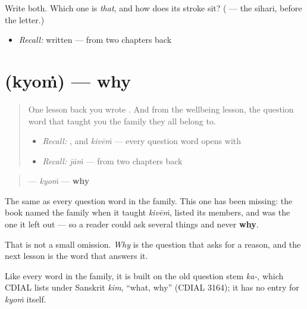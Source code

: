 \begin{tcolorbox}[breakable,colback=teal!4,colframe=teal!35!black,title={Before you move on}]
Write both. Which one is \emph{that}, and how does its stroke sit? (\textbf{} — the sihari, before the letter.)

\begin{itemize}
\raggedright
  \item \emph{Recall:} \textbf{} written — from two chapters back
\end{itemize}
\end{tcolorbox}
\section[\texorpdfstring{\pa{ਕਿਉਂ} (kyoṁ)}{ਕਿਉਂ (kyoṁ)}]{ (kyoṁ) — why}

\label{lesson:PA-C40-kyon}



\begin{quote}
One lesson back you wrote \textbf{}. And from the wellbeing lesson, the question word that taught you the family they all belong to.

\begin{itemize}
\raggedright
  \item \emph{Recall:} \textbf{}, and \emph{kivēṁ} — every question word opens with \textbf{}
  \item \emph{Recall:} \emph{jāṁ} — from two chapters back
\end{itemize}
\end{quote}

\begin{cousinweb}
\begin{quote}
\textbf{} — \emph{kyoṁ} — \textbf{why}
\end{quote}

The same \textbf{} as every question word in the family. This one has been missing: the book named the family when it taught \emph{kivēṁ}, listed its members, and \textbf{} was the one it left out — so a reader could ask several things and never \textbf{why}.

That is not a small omission. \emph{Why} is the question that asks for a reason, and the next lesson is the word that answers it.

Like every word in the family, it is built on the old question stem \emph{ka-}, which CDIAL lists under Sanskrit \emph{kim}, \textquotedblleft{}what, why\textquotedblright{} (CDIAL 3164); it has no entry for \emph{kyoṁ} itself.
\end{cousinweb}

